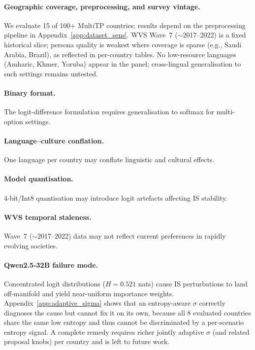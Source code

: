 \documentclass{article}
\begin{document}
\paragraph{Geographic coverage, preprocessing, and survey vintage.}
We evaluate 15 of 100+ MultiTP countries; results depend on the preprocessing
pipeline in Appendix~\ref{app:dataset_sens}.
WVS Wave~7 ($\sim$2017--2022) is a fixed historical slice; persona quality is
weakest where coverage is sparse (e.g., Saudi Arabia, Brazil), as reflected in
per-country tables.
No low-resource languages (Amharic, Khmer, Yoruba) appear in the panel;
cross-lingual generalisation to such settings remains untested.

\paragraph{Binary format.}
The logit-difference formulation requires generalisation to softmax for multi-option
settings.

\paragraph{Language--culture conflation.}
One language per country may conflate linguistic and cultural effects.

\paragraph{Model quantisation.}
4-bit/Int8 quantisation may introduce logit artefacts affecting IS stability.

\paragraph{WVS temporal staleness.}
Wave~7 ($\sim$2017--2022) data may not reflect current preferences in rapidly
evolving societies.

\paragraph{Qwen2.5-32B failure mode.}
Concentrated logit distributions ($H{=}0.521$ nats) cause IS perturbations to
land off-manifold and yield near-uniform importance weights. Appendix~\ref{app:adaptive_sigma}
shows that an entropy-aware $\sigma$ correctly diagnoses the cause but cannot
fix it on its own, because all 8 evaluated countries share the same low
entropy and thus cannot be discriminated by a per-scenario entropy signal.
A complete remedy requires richer jointly adaptive $\sigma$ (and related proposal
knobs) per country and is left to future work.
\end{document}
